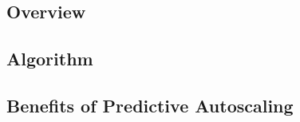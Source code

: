 \subsection{Overview}



\subsection{Algorithm}



\subsection{Benefits of Predictive Autoscaling}
\label{architecture-predictive-autoscaling-in-relation-to-kubernetes-benefits-of-predictive-autoscaling}


